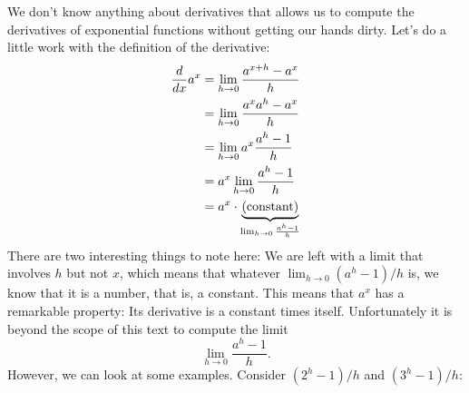 We don't know anything about derivatives that allows us to compute the
derivatives of exponential functions without getting our hands
dirty. Let's do a little work with the definition of the derivative:
\begin{align*}
\frac{d}{dx} a^x &=\lim_{h\to 0} \frac{a^{x+h}-a^x}{h} \\
&=\lim_{h\to 0} \frac{a^xa^{h}-a^x}{h} \\
&=\lim_{h\to 0} a^x\frac{a^{h}-1}{h} \\
&=a^x\lim_{h\to 0} \frac{a^{h}-1}{h} \\
&=a^x \cdot \underbrace{\text{(constant)}}_{\lim_{h\to 0} \frac{a^{h}-1}{h}}
\end{align*}
There are two interesting things to note here: We are left with a
limit that involves $h$ but not $x$, which means that whatever $
\lim_{h\to 0} (a^h-1)/h$ is, we know that it is a number, that is, a
constant. This means that $a^x$ has a remarkable property: Its
derivative is a constant times itself. Unfortunately it is beyond the
scope of this text to compute the limit
\[
\lim_{h\to 0} \frac{a^h-1}{h}.
\]
However, we can look at some examples. Consider $(2^h-1)/h$ and $(3^h-1)/h$:
